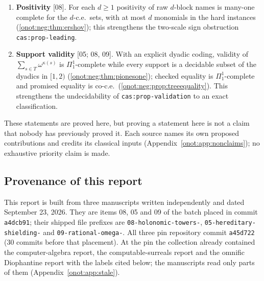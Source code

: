 \documentclass[11pt,oneside]{article}
\numberwithin{equation}{section}
\theoremstyle{definition}
\theoremstyle{remark}
\newcommand{\src}[1]{\textup{\textsf{\small[#1]}}}
\newcommand{\replabel}[1]{\nolinkurl{#1}}
\newcommand{\fn}[1]{\nolinkurl{#1}}
\begin{document}
\begin{enumerate}[label=\textup{(\arabic*)},leftmargin=*,itemsep=3pt]
$\Pi^0_1$-complete, already on values with at most one monomial
(\cref{onot:neg:thm:rawequality}); no algorithm translates these names, or the
full-support rational switch names, into any system with decidable equality,
although every value has a finite rational name
(\cref{onot:neg:thm:notranslator,onot:neg:thm:rationalhard}). The two reductions
are those of \replabel{cas:thm-zerotest} in the computer-algebra report; what
is new is their omnific placement, the explicit translator corollaries, and the
exact minimal realization dimension $s+1$ with no computable bound
(\cref{onot:neg:thm:statebound}).
\item \textbf{Positivity} \src{08}. For each $d\ge1$ positivity of raw
$d$-block names is many-one complete for the $d$-c.e.\ sets, with at most $d$
monomials in the hard instances (\cref{onot:neg:thm:ershov}); this strengthens the
two-scale sign obstruction \replabel{cas:prop-leading}.
\item \textbf{Support validity} \src{05; 08, 09}. With an explicit dyadic
coding, validity of $\sum_{s\in T}\omega^{\kappa(s)}$ is $\Pi^1_1$-complete while
every support is a decidable subset of the dyadics in $[1,2)$
(\cref{onot:neg:thm:pionesone}); checked equality is $\Pi^1_1$-complete and
promised equality is co-c.e.\ (\cref{onot:neg:prop:treeequality}). This
strengthens the undecidability of \replabel{cas:prop-validation} to an exact
classification.
\end{enumerate}

These statements are proved here, but proving a statement here is not a claim
that nobody has previously proved it. Each source names its own proposed
contributions and credits its classical inputs
(Appendix~\ref{onot:app:nonclaims}); no exhaustive priority claim is made.

\subsection{Provenance of this report}\label{onot:sub:provenance}

This report is built from three manuscripts written independently and dated
September 23, 2026. They are items 08, 05 and 09 of the batch placed in commit
\texttt{a4dcb91}; their shipped file prefixes are \fn{08-holonomic-towers-},
\fn{05-hereditary-shielding-} and \fn{09-rational-omega-}. All three pin
repository commit \texttt{a45d722} (30 commits before that placement). At the
pin the collection already contained the computer-algebra report, the
computable-surreals report and the omnific Diophantine report with the labels
cited below; the manuscripts read only parts of them
(Appendix~\ref{onot:app:stale}).
\end{document}
